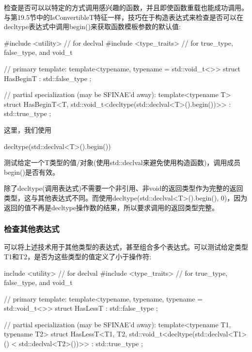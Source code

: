 检查是否可以以特定的方式调用感兴趣的函数，并且即使函数重载也能成功调用。与第19.5节中的IsConvertibleT特征一样，技巧在于构造表达式来检查是否可以在decltype表达式中调用begin()来获取函数模板参数的默认值:

\begin{cpp}
#include <utility> // for declval
#include <type_traits> // for true_type, false_type, and void_t

// primary template:
template<typename, typename = std::void_t<>>
struct HasBeginT : std::false_type {
};

// partial specialization (may be SFINAE'd away):
template<typename T>
struct HasBeginT<T, std::void_t<decltype(std::declval<T>().begin())>>
: std::true_type {
};
\end{cpp}

这里，我们使用

\begin{cpp}
decltype(std::declval<T>().begin())
\end{cpp}

测试给定一个T类型的值/对象(使用std::declval来避免使用构造函数)，调用成员begin()是否有效。

\begin{notice}
除了decltype(调用表达式)不需要一个非引用、非void的返回类型作为完整的返回类型，这与其他表达式不同。而使用decltype(std::declval<T>().begin(), 0)，因为返回的值不再是decltype操作数的结果，所以要求调用的返回类型完整。
\end{notice}

\subsubsection{检查其他表达式}

可以将上述技术用于其他类型的表达式，甚至组合多个表达式。可以测试给定类型T1和T2，是否为这些类型的值定义了小于操作符:

\begin{cpp}
include <utility> // for declval
#include <type_traits> // for true_type, false_type, and void_t

// primary template:
template<typename, typename, typename = std::void_t<>>
struct HasLessT : std::false_type
{
};

// partial specialization (may be SFINAE'd away):
template<typename T1, typename T2>
struct HasLessT<T1, T2, std::void_t<decltype(std::declval<T1>()
					< std::declval<T2>())>>
: std::true_type
{
};
\end{cpp}

